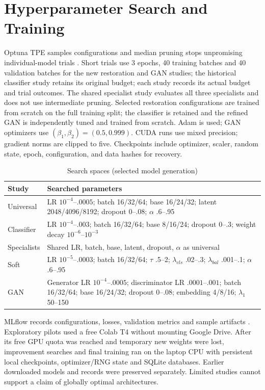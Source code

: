 \documentclass[conference]{IEEEtran}
\begin{document}
\section{Hyperparameter Search and Training}
Optuna TPE samples configurations and median pruning stops unpromising
individual-model trials \cite{optuna,optunapaper}. Short trials use 3 epochs, 40 training batches and 40 validation batches for the new restoration and GAN studies; the historical classifier study retains its original budget; each study records its actual
budget and trial outcomes. The shared specialist study evaluates all three
specialists and does not use intermediate pruning. Selected restoration configurations are trained from scratch on the full training split; the classifier is retained and the refined GAN is independently tuned and trained from scratch. Adam \cite{adam} is used; GAN
optimizers use $(\beta_1,\beta_2)=(0.5,0.999)$. CUDA runs use mixed precision;
gradient norms are clipped to five. Checkpoints include optimizer, scaler,
random state, epoch, configuration, and data hashes for recovery.

\begin{table}[!ht]\centering\caption{Search spaces (selected model generation)}\scriptsize
\begin{tabular}{p{.25\linewidth}p{.65\linewidth}}\toprule Study & Searched parameters\\\midrule
Universal & LR $10^{-4}$--$.0005$; batch 16/32/64; base 16/24/32; latent 2048/4096/8192; dropout 0--.08; $\alpha$ .6--.95\\
Classifier & LR $10^{-4}$--$.003$; batch 16/32/64; base 8/16/24; dropout 0--.3; weight decay $10^{-6}$--$10^{-3}$\\
Specialists & Shared LR, batch, base, latent, dropout, $\alpha$ as universal\\
Soft & LR $10^{-5}$--$.0003$; batch 16/32/64; $\tau$ .5--2; $\lambda_{cls}$ .02--.3; $\lambda_{bal}$ .001--.1; $\alpha$ .6--.95\\
GAN & Generator LR $10^{-4}$--$.0005$; discriminator LR $.0001$--$.001$; batch 16/32/64; base 16/24/32; dropout 0--.08; embedding 4/8/16; $\lambda_1$ 50--150\\\bottomrule
\end{tabular}\end{table}
MLflow records configurations, losses, validation metrics and sample artifacts
\cite{mlflow}. Exploratory pilots used a free Colab T4 without mounting Google Drive. After its free GPU quota was reached and temporary new weights were lost, improvement searches and final training ran on the laptop CPU with persistent local checkpoints, optimizer/RNG state and SQLite databases. Earlier downloaded models and records were preserved separately. Limited studies cannot support a claim of
globally optimal architectures.
\end{document}
